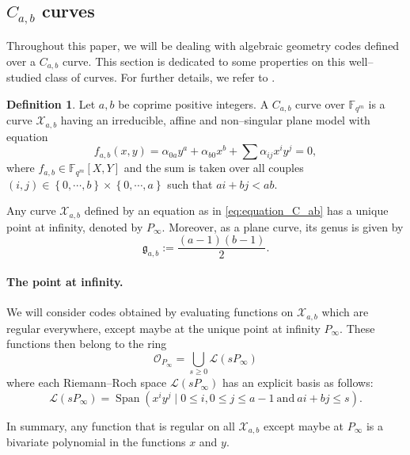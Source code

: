 \documentclass[a4paper]{amsart}
\theoremstyle{definition}
\newtheorem{definition}[thm]{Definition}
\theoremstyle{remark}
\newcommand{\calL}{\mathcal{L}}
\newcommand{\calX}{\mathcal{X}}
\newcommand{\fqm}{\mathbb{F}_{q^m}}
\newcommand{\set}[1]{\left\{#1\right\}}
\newcommand{\Span}[1]{\operatorname{Span}\left(#1\right)}
\begin{document}
\subsection{$C_{a,b}$ curves} \label{section:C_a,b_codes}
Throughout this paper, we will be dealing with algebraic geometry codes defined over a $C_{a,b}$ curve. This section is dedicated to some properties on this well--studied class of curves. For further details, we refer to \cite{Miu93}. 

\begin{definition} \label{def:C_ab_curves} 
Let $a,b$ be coprime positive integers. A $C_{a,b}$ curve over $\fqm$ is a curve $\calX_{a,b}$ having an irreducible, affine and non--singular plane model with equation
\begin{equation} \label{eq:equation_C_ab}
f_{a,b}(x,y) = \alpha_{0a}y^a + \alpha_{b0}x^b + \sum \alpha_{ij}x^iy^j = 0,
\end{equation}
where $f_{a,b} \in \fqm[X,Y]$ and the sum is taken over all couples $(i,j) \in \set{0,\cdots,b} \times \set{0,\cdots,a}$ such that $ai+bj < ab$.
\end{definition}
Any curve $\calX_{a,b}$ defined by an equation as in \eqref{eq:equation_C_ab} has a unique point at infinity, denoted by $P_{\infty}$. Moreover, as a plane curve, its genus is given by
\[\mathfrak{g}_{a,b}:=\dfrac{(a-1)(b-1)}{2}.\]

\paragraph{The point at infinity.} We will consider codes obtained by evaluating functions on $\calX_{a,b}$ which are regular everywhere, except maybe at the unique point at infinity $P_\infty$. These functions then belong to the ring 
\begin{equation}\label{eq:O_Pinf}
\mathcal{O}_{P_\infty}=\bigcup_{s \geq 0} \calL(s P_\infty)
\end{equation} %
where each Riemann--Roch space $\calL(s P_\infty)$ has an explicit basis as follows:
\begin{equation} \label{eq:basis_L(sP_inf)}
    \calL(sP_{\infty}) = \Span{x^iy^j \mid 0 \leq i, 0\leq j\leq a-1 \ \mathrm{and} \ ai+bj \leq s}.
\end{equation}

In summary, any function that is regular on all $\calX_{a,b}$ except maybe at $P_\infty$ is a bivariate polynomial in the functions $x$ and $y$. 
\end{document}
